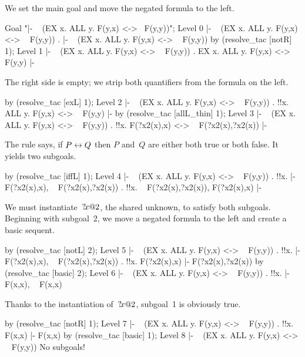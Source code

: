 We set the main goal and move the negated formula to the left.
\begin{ttbox}
Goal "|- ~ (EX x. ALL y. F(y,x) <-> ~F(y,y))";
{\out Level 0}
{\out  |- ~ (EX x. ALL y. F(y,x) <-> ~ F(y,y))}
{.  |- ~ (EX x. ALL y. F(y,x) <-> ~ F(y,y))}
by (resolve_tac [notR] 1);
{\out Level 1}
{\out  |- ~ (EX x. ALL y. F(y,x) <-> ~ F(y,y))}
{. EX x. ALL y. F(y,x) <-> ~ F(y,y) |-}
\end{ttbox}
The right side is empty; we strip both quantifiers from the formula on the
left.
\begin{ttbox}
by (resolve_tac [exL] 1);
{\out Level 2}
{\out  |- ~ (EX x. ALL y. F(y,x) <-> ~ F(y,y))}
{. !!x. ALL y. F(y,x) <-> ~ F(y,y) |-}
by (resolve_tac [allL_thin] 1);
{\out Level 3}
{\out  |- ~ (EX x. ALL y. F(y,x) <-> ~ F(y,y))}
{. !!x. F(?x2(x),x) <-> ~ F(?x2(x),?x2(x)) |-}
\end{ttbox}
The rule  says, if $P\leftrightarrow Q$ then $P$ and~$Q$ are either
both true or both false.  It yields two subgoals.
\begin{ttbox}
by (resolve_tac [iffL] 1);
{\out Level 4}
{\out  |- ~ (EX x. ALL y. F(y,x) <-> ~ F(y,y))}
{. !!x.  |- F(?x2(x),x), ~ F(?x2(x),?x2(x))}
{. !!x. ~ F(?x2(x),?x2(x)), F(?x2(x),x) |-}
\end{ttbox}
We must instantiate~${?\!x@2}$, the shared unknown, to satisfy both
subgoals.  Beginning with subgoal~2, we move a negated formula to the left
and create a basic sequent.
\begin{ttbox}
by (resolve_tac [notL] 2);
{\out Level 5}
{\out  |- ~ (EX x. ALL y. F(y,x) <-> ~ F(y,y))}
{. !!x.  |- F(?x2(x),x), ~ F(?x2(x),?x2(x))}
{. !!x. F(?x2(x),x) |- F(?x2(x),?x2(x))}
by (resolve_tac [basic] 2);
{\out Level 6}
{\out  |- ~ (EX x. ALL y. F(y,x) <-> ~ F(y,y))}
{. !!x.  |- F(x,x), ~ F(x,x)}
\end{ttbox}
Thanks to the instantiation of~${?\!x@2}$, subgoal~1 is obviously true.
\begin{ttbox}
by (resolve_tac [notR] 1);
{\out Level 7}
{\out  |- ~ (EX x. ALL y. F(y,x) <-> ~ F(y,y))}
{. !!x. F(x,x) |- F(x,x)}
by (resolve_tac [basic] 1);
{\out Level 8}
{\out  |- ~ (EX x. ALL y. F(y,x) <-> ~ F(y,y))}
{\out No subgoals!}
\end{ttbox}

